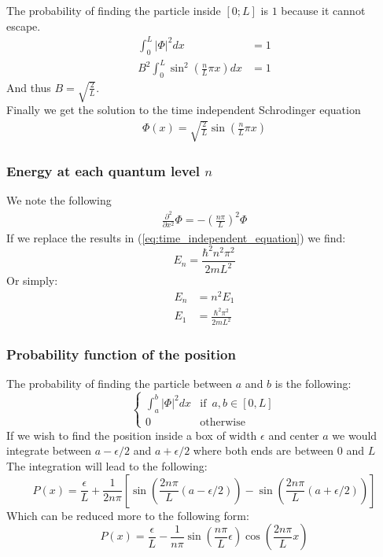 \documentclass[a4paper, 10pt]{article}
\begin{document}
        The probability of finding the particle inside $[0; L]$ is $1$ because
        it cannot escape.
        \begin{align}
            \int_{0}^{L} |\Phi|^2 dx &= 1  \\
            B^2\int_{0}^{L} \sin^2\left ( \frac{n}{L}\pi x \right ) dx &= 1
        \end{align}
        And thus $B = \sqrt{\frac{2}{L}}$.\\
        Finally we get the solution to the time independent Schrodinger equation
        \begin{align}
            \Phi(x) = \sqrt{\frac{2}{L}}\sin(\frac{n}{L}\pi x)
        \end{align}

        \subsubsection{Energy at each quantum level $n$}
        \label{sec:energy_oned}
        We note the following
        \begin{align}
            \frac{\partial^2 }{\partial x^2} \Phi = -\left (
            \frac{n\pi}{L}\right )^2 \Phi
        \end{align}
        If we replace the results in (\ref{eq:time_independent_equation}) we find:
        $$ E_n = \frac{\hbar^2 n^2 \pi^2}{ 2 m L^2} $$
        Or simply:
        \begin{align*}
            E_n &= n^2 E_1 \\
            E_1 &= \frac{\hbar^2 \pi^2}{2 m L^2}
        \end{align*}

        \subsubsection{Probability function of the position}
        \label{sec:position_oned}
        The probability of finding the particle between $a$ and $b$ is the following:
        \begin{equation} \label{eq:probability_position}
            \left\{\begin{matrix}
            \int_{a}^{b} |\Phi|^2 dx & \text{if} \; \: a,b \in [0, L] \\ 
            0 & \text{otherwise}
            \end{matrix}\right.
        \end{equation}
        If we wish to find the position inside a box of width $\epsilon$ and
        center $a$ we would integrate between $a-\epsilon/2$ and $a+\epsilon/2$
        where both ends are between $0$ and $L$\\
        The integration will lead to the following:
        $$ P(x) = \frac{\epsilon}{L} + \frac{1}{2n\pi} \left [ 
            \sin\left ( \frac{2n\pi}{L}(a - \epsilon/2)\right ) -
            \sin\left ( \frac{2n\pi}{L}(a + \epsilon/2)\right )
        \right ]$$
        Which can be reduced more to the following form:
        $$ P(x) = \frac{\epsilon}{L} - \frac{1}{n\pi}\sin\left( \frac{n\pi}{L}\epsilon \right)
        \cos\left(\frac{2n\pi}{L}x\right)$$
\end{document}
